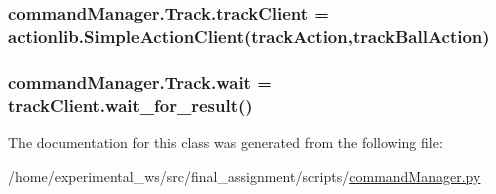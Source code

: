 \subsubsection[{\texorpdfstring{track\+Client}{trackClient}}]{\setlength{\rightskip}{0pt plus 5cm}command\+Manager.\+Track.\+track\+Client = actionlib.\+Simple\+Action\+Client(\textquotesingle{}track\+Action\textquotesingle{},track\+Ball\+Action)\hspace{0.3cm}{\ttfamily [static]}}\hypertarget{classcommandManager_1_1Track_a4a57e4e548d9213c4623f5d528753b1f}{}\label{classcommandManager_1_1Track_a4a57e4e548d9213c4623f5d528753b1f}
\subsubsection[{\texorpdfstring{wait}{wait}}]{\setlength{\rightskip}{0pt plus 5cm}command\+Manager.\+Track.\+wait = track\+Client.\+wait\+\_\+for\+\_\+result()\hspace{0.3cm}{\ttfamily [static]}}\hypertarget{classcommandManager_1_1Track_a8f86bbb5fd3d92749c09d5e876a1d1a6}{}\label{classcommandManager_1_1Track_a8f86bbb5fd3d92749c09d5e876a1d1a6}


The documentation for this class was generated from the following file\+:\begin{DoxyCompactItemize}
\item 
/home/experimental\+\_\+ws/src/final\+\_\+assignment/scripts/\hyperlink{commandManager_8py}{command\+Manager.\+py}\end{DoxyCompactItemize}
